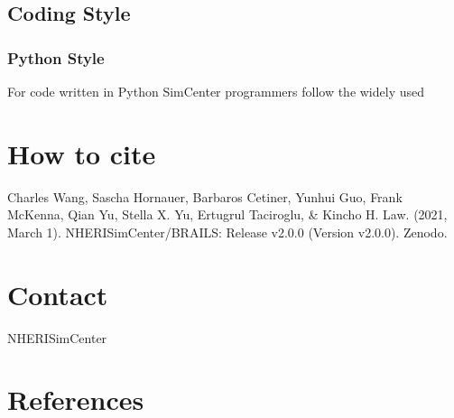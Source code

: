 \documentclass[letterpaper,10pt,english]{sphinxmanual}
\begin{document}
\section{Coding Style}
\label{\detokenize{common/developer_manual/coding_style/coding_style:coding-style}}\label{\detokenize{common/developer_manual/coding_style/coding_style:lblcodingstyle}}\label{\detokenize{common/developer_manual/coding_style/coding_style::doc}}

\subsection{Python Style}
\label{\detokenize{common/developer_manual/coding_style/coding_style:python-style}}
\sphinxAtStartPar
For code written in Python SimCenter programmers follow the widely used


\chapter{How to cite}
\label{\detokenize{index:how-to-cite}}
\sphinxAtStartPar
Charles Wang, Sascha Hornauer, Barbaros Cetiner, Yunhui Guo, Frank McKenna, Qian Yu, Stella X. Yu, Ertugrul Taciroglu, \& Kincho H. Law. (2021, March 1). NHERI\sphinxhyphen{}SimCenter/BRAILS: Release v2.0.0 (Version v2.0.0). Zenodo. 


\chapter{Contact}
\label{\detokenize{index:contact}}
\sphinxAtStartPar
NHERI\sphinxhyphen{}SimCenter 


\chapter{References}
\label{\detokenize{index:references}}
\sphinxAtStartPar
\end{document}
